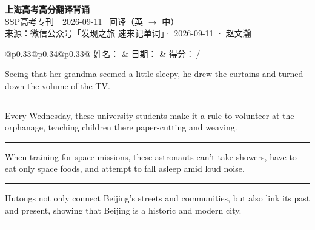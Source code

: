 \documentclass[11pt,a4paper]{article}
\newcommand{\num}[1]{\makebox[1.9em][r]{#1.}\hspace{0.3em}}
\newcommand{\wline}{\noindent\rule{\linewidth}{0.4pt}}
\begin{document}
\pagestyle{plain}
\begin{center}
{\LARGE\bfseries 上海高考高分翻译背诵 }\\[0.25em]
{\large SSP高考专刊　2026-09-11 \quad\ 回译（英 $\to$ 中）}\\[0.35em]
{\footnotesize 来源：微信公众号「发现之旅 速来记单词」· 2026-09-11 · 赵文瀚}
\end{center}

\vspace{0.4em}
\noindent\begin{tabular}{@{}p{0.33\textwidth}@{}p{0.34\textwidth}@{}p{0.33\textwidth}@{}}
姓名：\underline{\hspace{2.0cm}} & 日期：\underline{\hspace{2.0cm}} & 得分：\underline{\hspace{1.4cm}}\,/ \\
\end{tabular}

\vspace{0.5em}

\vspace{0.8em}
\num{1}Seeing that her grandma seemed a little sleepy, he drew the curtains and turned down the volume of the TV.

\vspace{0.25em}

\wline

\num{2}Every Wednesday, these university students make it a rule to volunteer at the orphanage, teaching children there paper-cutting and weaving.

\vspace{0.25em}

\wline

\num{3}When training for space missions, these astronauts can’t take showers, have to eat only space foods, and attempt to fall asleep amid loud noise.

\vspace{0.25em}

\wline

\num{4}Hutongs not only connect Beijing’s streets and communities, but also link its past and present, showing that Beijing is a historic and modern city.

\vspace{0.25em}

\wline
\end{document}
